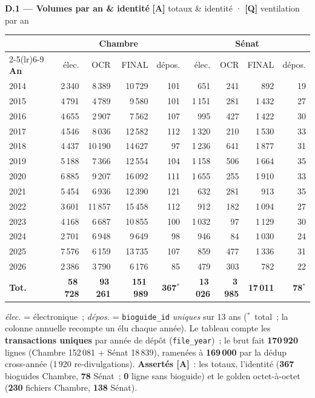 \documentclass[11pt,a4paper]{article}
\newcommand{\co}[1]{\texttt{\small #1}}
\begin{document}
\textbf{D.1 — Volumes par an \& identité} \hfill {\footnotesize\textbf{[A]} totaux \& identité · \textbf{[Q]} ventilation par an}
\begin{center}\small
\begin{tabular}{l rrrr @{\hspace{1.4em}} rrrr}
\toprule
& \multicolumn{4}{c}{\bfseries\color{houseC}Chambre} & \multicolumn{4}{c}{\bfseries\color{senateC}Sénat}\\
\cmidrule(lr){2-5}\cmidrule(lr){6-9}
\bfseries An & élec. & OCR & FINAL & dépos. & élec. & OCR & FINAL & dépos.\\
\midrule
2014 & 2\,340 & 8\,389 & 10\,729 & 101 & 651 & 241 & 892 & 19 \\
2015 & 4\,791 & 4\,789 & 9\,580 & 101 & 1\,151 & 281 & 1\,432 & 27 \\
2016 & 4\,655 & 2\,907 & 7\,562 & 107 & 995 & 427 & 1\,422 & 30 \\
2017 & 4\,546 & 8\,036 & 12\,582 & 112 & 1\,320 & 210 & 1\,530 & 33 \\
2018 & 4\,437 & 10\,190 & 14\,627 & 97 & 1\,236 & 641 & 1\,877 & 31 \\
2019 & 5\,188 & 7\,366 & 12\,554 & 104 & 1\,158 & 506 & 1\,664 & 35 \\
2020 & 6\,885 & 9\,207 & 16\,092 & 111 & 1\,655 & 255 & 1\,910 & 33 \\
2021 & 5\,454 & 6\,936 & 12\,390 & 121 & 632 & 281 & 913 & 35 \\
2022 & 3\,601 & 11\,857 & 15\,458 & 112 & 912 & 182 & 1\,094 & 27 \\
2023 & 4\,168 & 6\,687 & 10\,855 & 100 & 1\,032 & 97 & 1\,129 & 30 \\
2024 & 2\,701 & 6\,948 & 9\,649 & 98 & 946 & 84 & 1\,030 & 24 \\
2025 & 7\,576 & 6\,159 & 13\,735 & 107 & 859 & 477 & 1\,336 & 31 \\
2026 & 2\,386 & 3\,790 & 6\,176 & 85 & 479 & 303 & 782 & 22 \\
\midrule
\bfseries Tot. & \bfseries 58\,728 & \bfseries 93\,261 & \bfseries 151\,989 & \bfseries 367$^\ast$ & \bfseries 13\,026 & \bfseries 3\,985 & \bfseries 17\,011 & \bfseries 78$^\ast$\\
\bottomrule
\end{tabular}
\end{center}
{\footnotesize \emph{élec.} = électronique~; \emph{dépos.} = \co{bioguide_id} \emph{uniques} sur 13 ans
($^\ast$~total~; la colonne annuelle recompte un élu chaque année). Le tableau compte les
\textbf{transactions uniques} par année de dépôt (\co{file_year})~; le brut fait \textbf{170\,920} lignes
(Chambre 152\,081 + Sénat 18\,839), ramenées à \textbf{169\,000} par la dédup cross-année (1\,920
re-divulgations). \textbf{Assertés [A]}~: les totaux, l'identité (\textbf{367} bioguides Chambre,
\textbf{78} Sénat~; \textbf{0} ligne sans bioguide) et le golden octet-à-octet (\textbf{230} fichiers
Chambre, \textbf{138} Sénat).}
\end{document}
